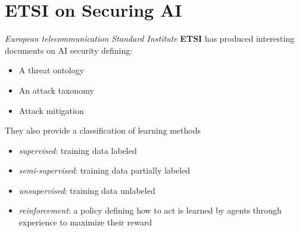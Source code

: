 
\section{ETSI on Securing AI}
\textit{European telecommunication Standard Institute} \textbf{ETSI} has produced
interesting documents on AI security defining:
\begin{itemize}
   \item A threat ontology
   \item An attack taxonomy
   \item Attack mitigation
\end{itemize}

They also provide a classification of learning methods
\begin{itemize}
   \item \textit{supervised}: training data labeled
   \item \textit{semi-supervised}: training data partially labeled
   \item \textit{unsupervised}: training data unlabeled
   \item \textit{reinforcement}: a policy defining how to act is learned by agents through
   experience to maximize their reward
\end{itemize} 

